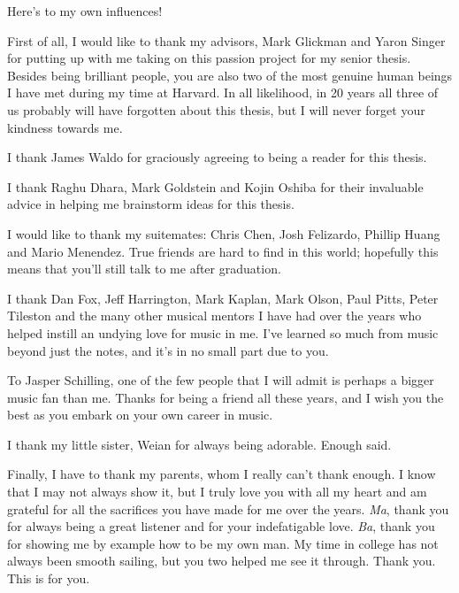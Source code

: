 
Here's to my own influences!

First of all, I would like to thank my advisors, Mark Glickman and Yaron Singer for putting up with me taking on this passion project for my senior thesis. Besides being brilliant people, you are also two of the most genuine human beings I have met during my time at Harvard. In all likelihood, in 20 years all three of us probably will have forgotten about this thesis, but I will never forget your kindness towards me.

I thank James Waldo for graciously agreeing to being a reader for this thesis.

I thank Raghu Dhara, Mark Goldstein and Kojin Oshiba for their invaluable advice in helping me brainstorm ideas for this thesis.

I would like to thank my suitemates: Chris Chen, Josh Felizardo, Phillip Huang and Mario Menendez. True friends are hard to find in this world; hopefully this means that you'll still talk to me after graduation.

I thank Dan Fox, Jeff Harrington, Mark Kaplan, Mark Olson, Paul Pitts, Peter Tileston and the many other musical mentors I have had over the years who helped instill an undying love for music in me. I've learned so much from music beyond just the notes, and it's in no small part due to you.

To Jasper Schilling, one of the few people that I will admit is perhaps a bigger music fan than me. Thanks for being a friend all these years, and I wish you the best as you embark on your own career in music.

I thank my little sister, Weian for always being adorable. Enough said.

Finally, I have to thank my parents, whom I really can't thank enough. I know that I may not always show it, but I truly love you with all my heart and am grateful for all the sacrifices you have made for me over the years. \textit{Ma}, thank you for always being a great listener and for your indefatigable love. \textit{Ba}, thank you for showing me by example how to be my own man. My time in college has not always been smooth sailing, but you two helped me see it through. Thank you. This is for you.



